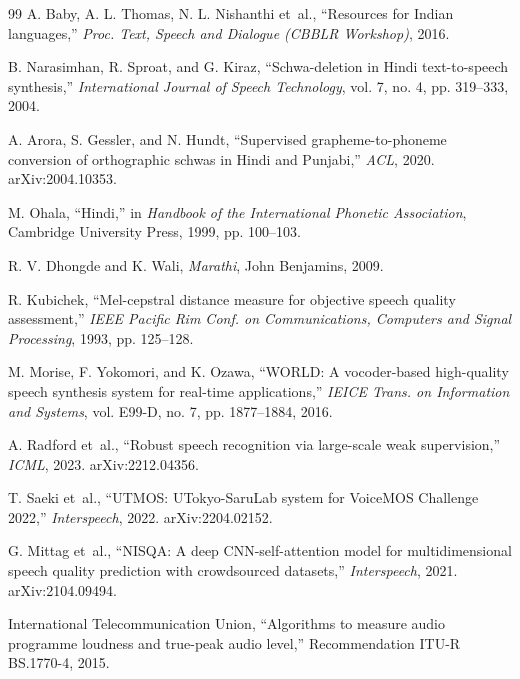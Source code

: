 \documentclass[12pt,a4paper]{article}
\begin{document}
\begin{thebibliography}{99}
A. Baby, A. L. Thomas, N. L. Nishanthi et~al., ``Resources for
Indian languages,'' \textit{Proc. Text, Speech and Dialogue (CBBLR Workshop)},
2016.

B. Narasimhan, R. Sproat, and G. Kiraz, ``Schwa-deletion in Hindi text-to-speech
synthesis,'' \textit{International Journal of Speech Technology}, vol. 7,
no. 4, pp. 319--333, 2004.

A. Arora, S. Gessler, and N. Hundt, ``Supervised grapheme-to-phoneme conversion
of orthographic schwas in Hindi and Punjabi,'' \textit{ACL}, 2020.
arXiv:2004.10353.

M. Ohala, ``Hindi,'' in \textit{Handbook of the International Phonetic
Association}, Cambridge University Press, 1999, pp. 100--103.

R. V. Dhongde and K. Wali, \textit{Marathi}, John Benjamins, 2009.

R. Kubichek, ``Mel-cepstral distance measure for objective speech quality
assessment,'' \textit{IEEE Pacific Rim Conf. on Communications, Computers and
Signal Processing}, 1993, pp. 125--128.

M. Morise, F. Yokomori, and K. Ozawa, ``WORLD: A vocoder-based high-quality
speech synthesis system for real-time applications,'' \textit{IEICE Trans. on
Information and Systems}, vol. E99-D, no. 7, pp. 1877--1884, 2016.

A. Radford et~al.,
``Robust speech recognition via large-scale weak supervision,'' \textit{ICML},
2023. arXiv:2212.04356.

T. Saeki et~al., ``UTMOS: UTokyo-SaruLab system for VoiceMOS Challenge 2022,''
\textit{Interspeech}, 2022. arXiv:2204.02152.

G. Mittag et~al., ``NISQA: A deep
CNN-self-attention model for multidimensional speech quality prediction with
crowdsourced datasets,'' \textit{Interspeech}, 2021. arXiv:2104.09494.

International Telecommunication Union, ``Algorithms to measure audio programme
loudness and true-peak audio level,'' Recommendation ITU-R BS.1770-4, 2015.

\end{thebibliography}
\endgroup
\end{document}
